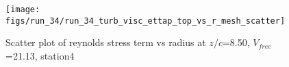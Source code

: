 \begin{figure}[H]
\centering
\texttt{[image: figs/run\_34/run\_34\_turb\_visc\_ettap\_top\_vs\_r\_mesh\_scatter]}
\caption{Scatter plot of reynolds stress term vs radius at $z/c$=8.50, $V_{free}$=21.13, station4}
\label{fig:run_34_turb_visc_ettap_top_vs_r_mesh_scatter}
\end{figure}


